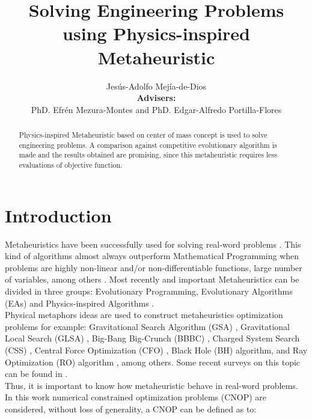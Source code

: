 \documentclass[12pt,letterpape]{article}
\title{Solving Engineering Problems using Physics-inspired Metaheuristic}
\author{Jesús-Adolfo Mejía-de-Dios
\\
{\bf Advisers:}\\
PhD. 
Efrén Mezura-Montes
and
PhD.
Edgar-Alfredo Portilla-Flores
}
\begin{document}
\maketitle

\begin{abstract}
	Physics-inspired Metaheuristic based on center of mass concept is used to solve
	engineering problems. A comparison against competitive evolutionary algorithm
	is made and the results obtained are promising, since this metaheuristic requires
	less evaluations of objective function.
\end{abstract}

\section{Introduction} %
\label{sec:introduction}

Metaheuristics have been successfully used for solving real-word problems \cite{easSurv}.
This kind of algorithms almost always outperform Mathematical Programming when problems
are highly non-linear and/or non-differentiable functions, large number of variables, 
among others \cite{problemas}. Most recently and important Metaheuristics can be divided in three
groups: Evolutionary Programming, Evolutionary Algorithms (EAs) and Physics-inspired
Algorithms \cite{biswas2013physics, easSurv, DBLP:journals/corr/FisterYFBF13,spall03}.\\

Physical metaphors ideas are used to construct metaheuristics optimization problems
for example: Gravitational  Search Algorithm (GSA) \cite{rashedi2009gsa}, 
Gravitational Local Search (GLSA) \cite{glsa}, Big-Bang Big-Crunch (BBBC) \cite{erol2006new}, 
Charged System Search (CSS) \cite{kaveh2010novel}, Central Force Optimization 
(CFO) \cite{cfo2007}, Black Hole (BH) \cite{hatamlou2013black} algorithm, and Ray 
Optimization (RO) algorithm \cite{kaveh2012new}, among others. Some recent surveys 
on this topic can be found in
\cite{fisicaSurvey,biswas2013physics,DBLP:journals/corr/FisterYFBF13,xie2011convergence}. \\

Thus, it is important to know how metaheuristic behave in real-word problems.
In this work numerical constrained optimization problems (CNOP) are considered,
without loss of generality, a CNOP can be defined as to:\\
\end{document}
